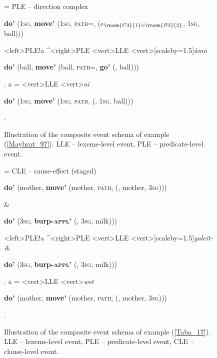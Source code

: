 \begin{figure}
\jtree[xunit=9.5em,yunit=2em]
\! = {PLE -- direction complex}{\begin{scriptsize}\textbf{do'} (1\textsc{sg}, \textbf{move'} (1\textsc{sg}, \textsc{path=}, \textbf{} (e$_{\rnode{C3}{1}=\rnode{B3}{2}}$, 1\textsc{sg}, ball)))\end{scriptsize}}
<left>{PLE}!a ^<right>{PLE}
<vert>{LLE}
<vert>[scaleby=1.5]{\textit{àmo}}{\begin{scriptsize} \textbf{do'} (ball, \textbf{move'} (ball, \textsc{path=}, \textbf{go'} (, ball)))\end{scriptsize}}.
\!a = <vert>{LLE}
<vert>{\textit{ai}}
{\begin{scriptsize} \textbf{do'} (1\textsc{sg}, \textbf{move'} (1\textsc{sg}, \textsc{path}, \textbf{} (, 1\textsc{sg}, ball)))\end{scriptsize}}.
\endjtree

\caption[Event schema illustration of example (\ref{Maybrat_97})]{Illustration of the composite event schema of example (\ref{Maybrat_97}). LLE -- lexeme-level event, PLE -- predicate-level event.}
\label{figure:eventschema_Maybrat97a}
\end{figure}


\begin{figure}
\jtree[xunit=9.5em,yunit=2em]
\! = {CLE -- cause-effect (staged)}{\begin{scriptsize} \textbf{do'} (mother, \textbf{move'} (mother, \textsc{path}, \textbf{} (, mother, 3\textsc{sg})))\end{scriptsize} \&}
{\begin{scriptsize} \textbf{do'} (3\textsc{sg}, \textbf{burp-\textsc{appl}'} (, 3\textsc{sg}, milk)))\end{scriptsize}}
<left>{PLE}!a ^<right>{PLE}
<vert>{LLE}
<vert>[scaleby=1.5]{\textit{galeit-ik}}{\begin{scriptsize} \textbf{do'} (3\textsc{sg}, \textbf{burp-\textsc{appl}'} (, 3\textsc{sg}, milk)))\end{scriptsize}}.
\!a = <vert>{LLE}
<vert>{\textit{wet}}
{\begin{scriptsize} \textbf{do'} (mother, \textbf{move'} (mother, \textsc{path}, \textbf{} (, mother, 3\textsc{sg})))\end{scriptsize}}.
\endjtree

\caption[Event schema illustration of example (\ref{Taba_17})]{Illustration of the composite event schema of example (\ref{Taba_17}). LLE -- lexeme-level event, PLE -- predicate-level event, CLE -- clause-level event.}
\label{figure:eventschema_Taba17}
\end{figure}


